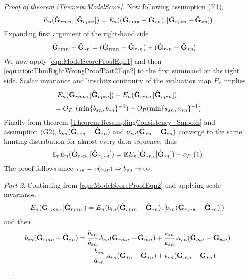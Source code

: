 \begin{proof}[Proof of theorem \ref{Theorem:ModelScore}]
Now following assumption (E1),
%
\begin{align}\label{eqn:ModelScoreProofEqn2}
E_n ( \hat {{\mathbf{G}}}_{r m n}, [ \hat {{\mathbf{G}}}_{r_1 * n} ] ) = E_n ( ( \hat {{\mathbf{G}}}_{r m n} - \hat {{\mathbf{G}}}_{* n} ), [   \hat {{\mathbf{G}}}_{r_1 * n} - \hat {{\mathbf{G}}}_{* n} ] )
\end{align}
%
Expanding first argument of the right-hand side
%
\begin{align*}
\hat {{\mathbf{G}}}_{r m n} - \hat {{\mathbf{G}}}_{* n}  & =  ( \hat {{\mathbf{G}}}_{r m n} - \hat {{\mathbf{G}}}_{r * n} ) + ( \hat {{\mathbf{G}}}_{r * n} - \hat {{\mathbf{G}}}_{* n} )
\end{align*}
%
We now apply \ref{eqn:ModelScoreProofEqn1} and then \ref{equation:ThmRightWrongProofPart2Eqn2} to the first summand on the right side. Scalar invariance and lipschitz continuity of the evaluation map $E_n$ implies
%
\begin{align*}
& \left| E_n ( \hat {{\mathbf{G}}}_{r m n}, [ \hat {{\mathbf{G}}}_{r_1 * n} ] ) - E_n ( \hat {{\mathbf{G}}}_{r * n}, [ \hat {{\mathbf{G}}}_{r_1 * n} ] ) \right| \\
&= O_{P_n} ( \min \{ b_{s n}, b_{* n} \}^{-1}) + O_{P} ( \min \{ a_{s n}, a_{* n} \}^{-1})
\end{align*}
%
Finally from theorem \ref{Theorem:ResamplingConsistency_Smooth} and assumption (G2), $b_{s n} ( \hat {{\mathbf{G}}}_{r * n} - \hat {{\mathbf{G}}}_{* n} )$ and $a_{s n} ( \hat {{\mathbf{G}}}_{* n} - {\mathbf{G}}_{* n} )$ converge to the same limiting distribution for almost every data sequence; thus
%
\begin{align*}
{\mathbb{E}}_r E_n ( \hat {{\mathbf{G}}}_{r * n}, [ \hat {{\mathbf{G}}}_{r_1 * n} ]) = {\mathbb{E}} E_n ( \hat {{\mathbf{G}}}_{* n}, [ \hat {{\mathbf{G}}}_{* n} ]) + o_{P_n}(1)
\end{align*}
%
The proof follows since $\tau_{s n} = o( a_{s n}) \Rightarrow b_{s n} \rightarrow \infty$.

\textit{Part 2.}
Continuing from \ref{eqn:ModelScoreProofEqn2} and applying scale invariance,
%
\begin{align*}
E_n ( \hat {{\mathbf{G}}}_{r m n}, [ \hat {{\mathbf{G}}}_{r_1 * n} ] ) = E_n ( b_{* n} ( \hat {{\mathbf{G}}}_{r m n} - \hat {{\mathbf{G}}}_{* n} ), [   b_{* n}  ( \hat {{\mathbf{G}}}_{r_1 * n} - \hat {{\mathbf{G}}}_{* n} ) ] )
\end{align*}
%
and then
%
\begin{align*}
b_{* n} ( \hat {{\mathbf{G}}}_{r m n} - \hat {{\mathbf{G}}}_{* n} ) & = \frac{ b_{* n} }{ b_{s n}} . b_{s n} ( \hat {{\mathbf{G}}}_{r m n} - \hat {{\mathbf{G}}}_{m n} ) + \frac{b_{* n}}{a_{s n}}. a_{s n} ( \hat {{\mathbf{G}}}_{m n} - {\mathbf{G}}_{m n} )  \notag\\
& \quad - \frac{b_{* n}}{a_{* n}}. a_{* n} ( \hat {{\mathbf{G}}}_{* n} - {\mathbf{G}}_{* n} ) + b_{* n} ( {\mathbf{G}}_{m n} - {\mathbf{G}}_{* n} )
\end{align*}


\end{proof}
